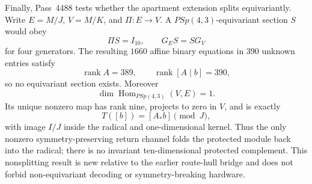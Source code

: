 Finally, Pass~4488 tests whether the apartment extension splits equivariantly.
Write $E=M/J$, $V=M/K$, and $\Pi:E\to V$.  A $PSp(4,3)$-equivariant section
$S$ would obey
\[
 \Pi S=I_{10},\qquad G_ES=SG_V
\]
for four generators.  The resulting $1660$ affine binary equations in $390$
unknown entries satisfy
\[
 \boxed{\operatorname{rank}A=389,\qquad
        \operatorname{rank}[A\mid b]=390,}
\]
so no equivariant section exists.  Moreover
\[
 \dim\operatorname{Hom}_{PSp(4,3)}(V,E)=1.
\]
Its unique nonzero map has rank nine, projects to zero in $V$, and is exactly
\[
 \boxed{T([b])=[A_*b]\pmod J,}
\]
with image $I/J$ inside the radical and one-dimensional kernel.  Thus the only
nonzero symmetry-preserving return channel folds the protected module back into
the radical; there is no invariant ten-dimensional protected complement.
This nonsplitting result is new relative to the earlier route-hull bridge and
does not forbid non-equivariant decoding or symmetry-breaking hardware.

%
%

%

%
